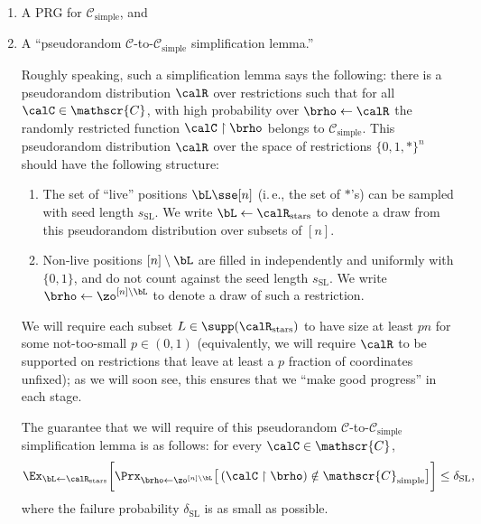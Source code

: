\documentclass[11pt]{article}
\numberwithin{equation}{section}
\theoremstyle{definition}
\theoremstyle{plain}
\newcommand{\ie}{i.\,e.}
\theoremstyle{plain}
\newcommand{\uhr}{\upharpoonright}
\newcommand{\simple}{\mathrm{simple}}
\newcommand{\stars}{\mathrm{stars}}
\newcommand{\SL}{\mathrm{SL}}
\begin{document}
\begin{enumerate}
\item A PRG for $\mathscr{C}_\simple$, and 
\item A ``pseudorandom $\mathscr{C}$-to-$\mathscr{C}_\simple$ simplification lemma.'' 


Roughly speaking, such a simplification lemma says the following: there is a pseudorandom distribution $\calR$ over restrictions such that for all $\calC \in \mathscr{C}$, with high probability over $\brho\leftarrow \calR$ the randomly restricted function $\calC \uhr \brho$ belongs to $\mathscr{C}_\simple$.  This pseudorandom distribution $\calR$ over the space of restrictions $\{0,1,\ast\}^n$ should have the following structure:  
\begin{enumerate}
\item The set of ``live'' positions $\bL \sse [n]$ (\ie, the set of $\ast$'s) can be sampled with seed length $s_\SL$.  We write $\bL \leftarrow \calR_\stars$ to denote a draw from this pseudorandom distribution over subsets of $[n]$. 
\item Non-live positions $[n]\setminus \bL$ are filled in independently and uniformly with $\{0,1\}$, and do not count against the seed length $s_\SL$. We write $\brho\leftarrow \zo^{[n]\setminus \bL}$ to denote a draw of such a restriction.
\end{enumerate} 

We will require each subset $L \in \supp(\calR_\stars)$ to have size at least $pn$ for some not-too-small $p \in (0,1)$ (equivalently, we will require $\calR$ to be supported on restrictions that leave at least a $p$ fraction of coordinates unfixed); as we will soon see, this ensures that we ``make good progress'' in each stage. 


The guarantee that we will require of this pseudorandom $\mathscr{C}$-to-$\mathscr{C}_\simple$ simplification lemma is  as follows: for every $\calC \in \mathscr{C}$, 
\begin{equation} \Ex_{\bL\leftarrow\calR_{\stars}}\bigg[ \Prx_{\brho\leftarrow\zo^{[n]\setminus \bL}}\big[\, (\calC \uhr \brho) \notin \mathscr{C}_\simple\big] \bigg]  \le \delta_\SL, \label{eq:PSL}
\end{equation} 
where the failure probability $\delta_\SL$ is as small as possible.  
\end{enumerate} 
\end{document}

